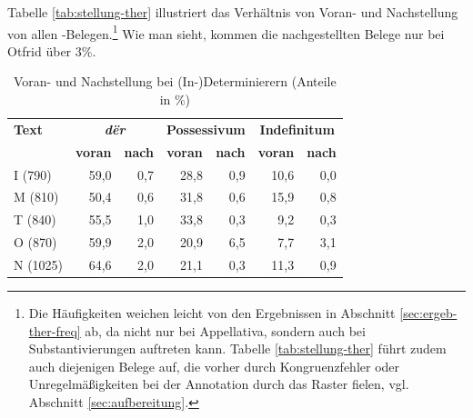 Tabelle \ref{tab:stellung-ther} illustriert das Verhältnis von Voran- und Nachstellung von allen -Belegen.\footnote{Die Häufigkeiten weichen leicht von den Ergebnissen in Abschnitt \ref{sec:ergeb-ther-freq} ab, da  nicht nur bei Appellativa, sondern auch bei Substantivierungen auftreten kann. Tabelle \ref{tab:stellung-ther} führt zudem auch diejenigen Belege auf, die vorher durch Kongruenzfehler oder Unregelmäßigkeiten bei der Annotation durch das Raster fielen, vgl. Abschnitt \ref{sec:aufbereitung}.} Wie man sieht, kommen die nachgestellten Belege nur bei Otfrid über 3\%. 

\begin{table}
\centering
\begin{tabular}{@{}lrrrrrr@{}}
\toprule
                      \textbf{Text} & \multicolumn{2}{c}{\textit{\textbf{dër}}}                             & \multicolumn{2}{c}{\textbf{Possessivum}}                               & \multicolumn{2}{c}{\textbf{Indefinitum}}    \\ 
\textbf{}              & \multicolumn{1}{c}{\textbf{voran}} & \multicolumn{1}{c}{\textbf{nach}} & \multicolumn{1}{c}{\textbf{voran}} & \multicolumn{1}{c}{\textbf{nach}} & \multicolumn{1}{c}{\textbf{voran}} & \multicolumn{1}{c}{\textbf{nach}} \\ \midrule
I (790)           & 59,0                              & 0,7                              & 28,8                              & 0,9                              & 10,6                              & 0,0                              \\
M (810) & 50,4                              & 0,6                              & 31,8                              & 0,6                              & 15,9                              & 0,8                              \\
T (840)           & 55,5                              & 1,0                              & 33,8                              & 0,3                              & 9,2                               & 0,3                              \\
O (870)           & 59,9                              & 2,0                              & 20,9                              & 6,5                              & 7,7                               & 3,1                              \\
N (1025)          & 64,6                              & 2,0                              & 21,1                              & 0,3                              & 11,3                              & 0,9                              \\ \bottomrule
\end{tabular}
\caption{Voran- und Nachstellung bei (In-)Determinierern (Anteile in \%)}
\label{tab:stellung-det}
\end{table}

